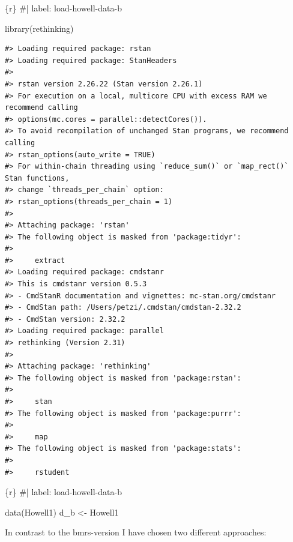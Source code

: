 \documentclass[
  letterpaper,
  DIV=11,
  numbers=noendperiod]{scrreprt}
\newenvironment{Shaded}{\begin{snugshade}}{\end{snugshade}}
\newcommand{\CommentTok}[1]{\textcolor[rgb]{0.37,0.37,0.37}{#1}}
\newcommand{\FunctionTok}[1]{\textcolor[rgb]{0.28,0.35,0.67}{#1}}
\newcommand{\InformationTok}[1]{\textcolor[rgb]{0.37,0.37,0.37}{#1}}
\newcommand{\NormalTok}[1]{\textcolor[rgb]{0.00,0.23,0.31}{#1}}
\newcommand{\OtherTok}[1]{\textcolor[rgb]{0.00,0.23,0.31}{#1}}
\begin{document}
\begin{Shaded}
\begin{Highlighting}[]
\InformationTok{\textasciigrave{}\textasciigrave{}\textasciigrave{}\{r\}}
\CommentTok{\#| label: load{-}howell{-}data{-}b}

\FunctionTok{library}\NormalTok{(rethinking)}
\InformationTok{\textasciigrave{}\textasciigrave{}\textasciigrave{}}
\end{Highlighting}
\end{Shaded}

\begin{verbatim}
#> Loading required package: rstan
#> Loading required package: StanHeaders
#> 
#> rstan version 2.26.22 (Stan version 2.26.1)
#> For execution on a local, multicore CPU with excess RAM we recommend calling
#> options(mc.cores = parallel::detectCores()).
#> To avoid recompilation of unchanged Stan programs, we recommend calling
#> rstan_options(auto_write = TRUE)
#> For within-chain threading using `reduce_sum()` or `map_rect()` Stan functions,
#> change `threads_per_chain` option:
#> rstan_options(threads_per_chain = 1)
#> 
#> Attaching package: 'rstan'
#> The following object is masked from 'package:tidyr':
#> 
#>     extract
#> Loading required package: cmdstanr
#> This is cmdstanr version 0.5.3
#> - CmdStanR documentation and vignettes: mc-stan.org/cmdstanr
#> - CmdStan path: /Users/petzi/.cmdstan/cmdstan-2.32.2
#> - CmdStan version: 2.32.2
#> Loading required package: parallel
#> rethinking (Version 2.31)
#> 
#> Attaching package: 'rethinking'
#> The following object is masked from 'package:rstan':
#> 
#>     stan
#> The following object is masked from 'package:purrr':
#> 
#>     map
#> The following object is masked from 'package:stats':
#> 
#>     rstudent
\end{verbatim}

\begin{Shaded}
\begin{Highlighting}[]
\InformationTok{\textasciigrave{}\textasciigrave{}\textasciigrave{}\{r\}}
\CommentTok{\#| label: load{-}howell{-}data{-}b}


\FunctionTok{data}\NormalTok{(Howell1)}
\NormalTok{d\_b }\OtherTok{\textless{}{-}}\NormalTok{ Howell1}
\InformationTok{\textasciigrave{}\textasciigrave{}\textasciigrave{}}
\end{Highlighting}
\end{Shaded}

In contrast to the bmrs-version I have chosen two different approaches:
\end{document}

